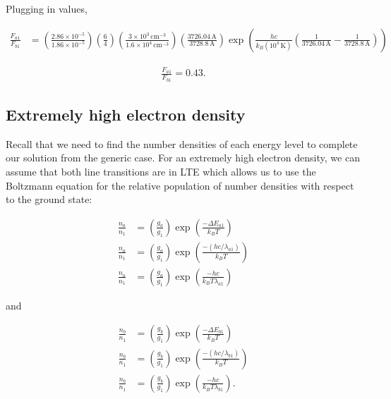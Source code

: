 \documentclass[12pt]{article}
\begin{document}
Plugging in values,

\begin{equation*}
\begin{split}
\frac{F_{a1}}{F_{b1}} &= \left(\frac{2.86\times10^{-5}}{1.86\times10^{-5}}\right) \left(\frac{6}{4}\right) \left(\frac{3\times10^3\,\mathrm{cm^{-3}}}{1.6\times10^4\,\mathrm{cm^{-3}}}\right) \left(\frac{3726.04\,\mathrm{A}}{3728.8\,\mathrm{A}}\right) \exp \left(\frac{hc}{k_B(10^4\,\mathrm{K})} \left(\frac{1}{3726.04\,\mathrm{A}} - \frac{1}{3728.8\,\mathrm{A}}\right)\right)
\end{split}
\end{equation*}

\begin{align*}
\boxed{ \frac{F_{a1}}{F_{b1}} = 0.43 }.
\end{align*}

\subsection*{Extremely high electron density}

Recall that we need to find the number densities of each energy level to complete our solution from the generic case. For an extremely high electron density, we can assume that both line transitions are in LTE which allows us to use the Boltzmann equation for the relative population of number densities with respect to the ground state:

\begin{equation*}
\begin{split}
\frac{n_a}{n_1} &= \left(\frac{g_a}{g_1}\right) \exp \left(\frac{- \Delta E_{a1}}{k_BT}\right) \\
\frac{n_a}{n_1} &= \left(\frac{g_a}{g_1}\right) \exp \left(\frac{- (hc/\lambda_{a1})}{k_BT}\right) \\
\frac{n_a}{n_1} &= \left(\frac{g_a}{g_1}\right) \exp \left(\frac{-hc}{k_BT\lambda_{a1}}\right)
\end{split}
\end{equation*}

and

\begin{equation*}
\begin{split}
\frac{n_b}{n_1} &= \left(\frac{g_b}{g_1}\right) \exp \left(\frac{- \Delta E_{b1}}{k_BT}\right) \\
\frac{n_b}{n_1} &= \left(\frac{g_b}{g_1}\right) \exp \left(\frac{- (hc/\lambda_{b1})}{k_BT}\right) \\
\frac{n_b}{n_1} &= \left(\frac{g_b}{g_1}\right) \exp \left(\frac{-hc}{k_BT\lambda_{b1}}\right).
\end{split}
\end{equation*}
\end{document}
